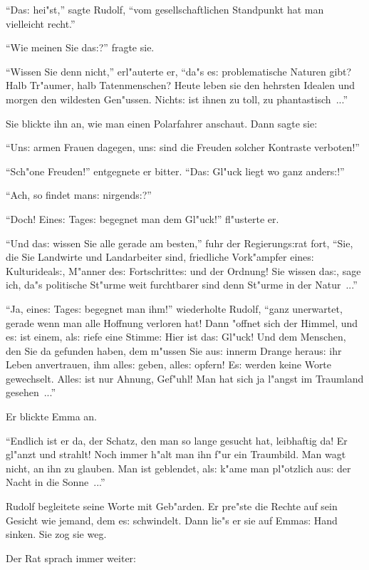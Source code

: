\documentclass[oneside,12pt]{book}
\newcommand{\s}{s:}%
\begin{document}
"`Da{\s} hei"st,"' sagte Rudolf, "`vom gesellschaftlichen
Standpunkt hat man vielleicht recht."'

"`Wie meinen Sie da{\s}?"' fragte sie.

"`Wissen Sie denn nicht,"' erl"auterte er, "`da"s e{\s}
problematische Naturen gibt? Halb Tr"aumer, halb Tatenmenschen?
Heute leben sie den hehrsten Idealen und morgen den wildesten
Gen"ussen. Nicht{\s} ist ihnen zu toll, zu phantastisch~..."'

Sie blickte ihn an, wie man einen Polarfahrer anschaut. Dann sagte
sie:

"`Un{\s} armen Frauen dagegen, un{\s} sind die Freuden solcher
Kontraste verboten!"'

"`Sch"one Freuden!"' entgegnete er bitter. "`Da{\s} Gl"uck liegt
wo ganz ander{\s}!"'

"`Ach, so findet man{\s} nirgend{\s}?"'

"`Doch! Eine{\s} Tage{\s} begegnet man dem Gl"uck!"' fl"usterte er.

"`Und da{\s} wissen Sie alle gerade am besten,"' fuhr der
Regierung{\s}rat fort, "`Sie, die Sie Landwirte und Landarbeiter
sind, friedliche Vork"ampfer eine{\s} Kulturideal{\s}, M"anner
de{\s} Fortschritte{\s} und der Ordnung! Sie wissen da{\s}, sage
ich, da"s politische St"urme weit furchtbarer sind denn St"urme in
der Natur~..."'

"`Ja, eine{\s} Tage{\s} begegnet man ihm!"' wiederholte Rudolf,
"`ganz unerwartet, gerade wenn man alle Hoffnung verloren hat!
Dann "offnet sich der Himmel, und e{\s} ist einem, al{\s} riefe
eine Stimme: {\glq}Hier ist da{\s} Gl"uck!{\grq} Und dem Menschen,
den Sie da gefunden haben, dem m"ussen Sie au{\s} innerm Drange
herau{\s} ihr Leben anvertrauen, ihm alle{\s} geben, alle{\s}
opfern! E{\s} werden keine Worte gewechselt. Alle{\s} ist nur
Ahnung, Gef"uhl! Man hat sich ja l"angst im Traumland gesehen~..."'

Er blickte Emma an.

"`Endlich ist er da, der Schatz, den man so lange gesucht hat,
leibhaftig da! Er gl"anzt und strahlt! Noch immer h"alt man ihn
f"ur ein Traumbild. Man wagt nicht, an ihn zu glauben. Man ist
geblendet, al{\s} k"ame man pl"otzlich au{\s} der Nacht in die
Sonne~..."'

Rudolf begleitete seine Worte mit Geb"arden. Er pre"ste die Rechte
auf sein Gesicht wie jemand, dem e{\s} schwindelt. Dann lie"s er
sie auf Emma{\s} Hand sinken. Sie zog sie weg.

Der Rat sprach immer weiter:
\end{document}
